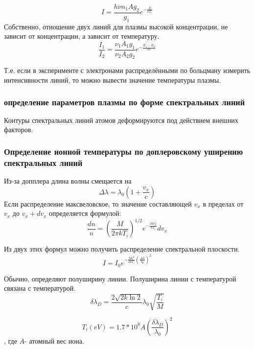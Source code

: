 \documentclass[10pt, a4paper]{article}
\begin{document}
\begin{equation}
	I=\frac{h \nu n_1 A g_2}{g_1} e^{-\frac{E}{kT_e}}
\end{equation}
Собственно, отношение двух линий для плазмы высокой концентрации, не зависит от концентрации, а зависит от температуру.
\begin{equation}
	\frac{I_1}{I_2}=\frac{ \nu_1 A_1 g_1}{ \nu_2 A_2 g_2} e^{-\frac{E_1 - E_2}{kT}}
\end{equation}

Т.е. если в эксперименте с электронами распределёнными по больцману измерить интенсивности линий, то можно вывести значение температуры плазмы. 

\subsubsection{определение параметров плазмы по форме спектральных линий}

Контуры спектральных линий атомов деформируются под действием внешних факторов.
\subsubsection{Определение ионной температуры по доплеровскому уширению спектральных линий}



Из-за допплера длина волны смещается на 
\begin{equation}
	\Delta \lambda = \lambda_0 \left(1+\frac{v_x}{c}\right)
\end{equation}
Если распределение максвеловское, то  значение составляющей $v_x$  в пределах от  $v_x$  до $v_x + dv_x$ определяется формулой:
\begin{equation}
	\frac{dn}{n}=\left(\frac{M}{2\pi kT_i}\right)^{1/2} e^{-\frac{Mv^{2}_x}{kT_i}} dv_x
\end{equation}

Из двух этих формул можно получить распределение спектральной плоскости.
\begin{equation}
	I=I_0 e^{-\frac{Mc^{2}}{2kT_i} (\frac{\Delta \lambda}{\lambda_0})^{2}}
\end{equation}

Обычно, определяют полуширину линии. Полуширина линии с температурой связана с температурой.
\begin{equation}
	\delta \lambda_D=\frac{2 \sqrt{2k \ln{2}}}{c} \lambda_0 \sqrt{\frac{T_i}{M}}
\end{equation}


\begin{equation}
	T_i(eV)=1.7*10^{8}A\left(\frac{\delta \lambda_D}{\lambda_0}\right)^{2}
\end{equation}
, где $A$- атомный вес иона.
\end{document}
